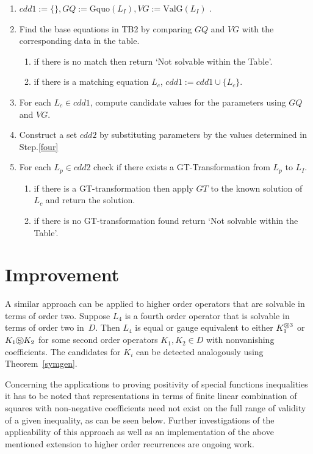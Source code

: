 \documentclass{article}
\newcommand{\cS}{\circledS}
\newcommand{\valg}{\mathrm{ValG}}
\newcommand{\Gq}{\mathrm{Gquo}}
\begin{document}
\begin{enumerate}
\item $cdd1:=\{\}, GQ:=\Gq(L_I), VG:=\valg(L_I)$ .
\item Find the base equations in TB2 by comparing $GQ$ and $VG$ with the corresponding data in the table.
\begin{enumerate}
\item if there is no match then return `Not solvable within the Table'.
\item if there is a matching equation $L_c$, $cdd1:=cdd1 \cup \{L_c\}$.
\end{enumerate}
\item\label{four} For each $L_c \in cdd1$, compute candidate values for the parameters using $GQ$ and $VG$.
\item Construct a set $cdd2$ by substituting parameters by the values determined in Step.\ref{four}
\item For each $L_p \in cdd2$ check if there exists a GT-Transformation from $L_p$ to $L_I$.
\begin{enumerate}
\item if there is a GT-transformation then apply $GT$ to the known solution of $L_c$ and return the solution.
\item if there is no GT-transformation found return `Not solvable within the Table'. 
\end{enumerate}

\end{enumerate}






\section{Improvement}
A similar approach can be applied to higher order operators that are solvable in terms
of order two. Suppose $L_4$ is a fourth order operator that is solvable in terms of order 
two in~$D$. Then $L_4$ is equal or gauge equivalent to either $K_1^{\cS 3}$ or $K_1\cS K_2$
for some second order operators $K_1,K_2\in D$ with nonvanishing coefficients. The candidates
for $K_i$ can be detected analogously using Theorem~\ref{symgen}.

Concerning the applications to proving positivity of special functions inequalities it has
to be noted that representations in terms of finite linear combination of squares with non-negative
coefficients need not exist on the full range of validity of a given inequality, as can be
seen below. Further investigations of the applicability of this approach as well as an
implementation of the above mentioned extension to higher order recurrences are ongoing
work.
\end{document}
